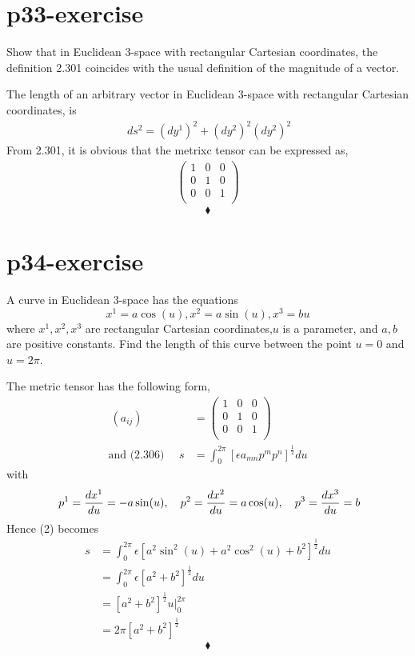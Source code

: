\section{p33-exercise}
\begin{tcolorbox}
Show that in Euclidean 3-space with rectangular Cartesian coordinates, the definition 2.301 coincides with the usual definition of the magnitude of a vector.
\end{tcolorbox}
The length of an arbitrary vector in Euclidean 3-space with rectangular Cartesian coordinates, is
\begin{align}
\ ds^2 = (dy^1)^2 + (dy^2)^2 (dy^2)^2
\end {align}
From 2.301, it is obvious that the metrixc tensor can be expressed as,
\begin{align}
\begin{pmatrix}1 & 0 &0 \\ 0 & 1 &0\\0 & 0 &1  \\ \end{pmatrix} 
\end{align}
$$\blacklozenge$$
\newpage


\section{p34-exercise}
\begin{tcolorbox}
A curve in Euclidean 3-space has the equations $$ x^1 =  a \cos(u), x^2 = a\sin(u), x^3 = bu$$ where $x^1, x^2,x^3$ are rectangular Cartesian coordinates,$u$ is a parameter, and $a, b$ are positive constants. Find the length of this curve between the point $u = 0$ and $u = 2\pi$.
\end{tcolorbox}
The metric tensor has the following form,
\begin{align}
\ (a_{ij}) &= \begin{pmatrix}1 & 0 &0 \\ 0 &1 &0\\0 & 0 &1  \\ \end{pmatrix} \\
\text {and  (2.306)  }\quad s &= \int^{2\pi}_0[\epsilon a_{mn}p^mp^n]^{\frac{1}{2}}du
\end{align}
with
\begin{align}
\ p^1 = \dv{x^1}{u} = -a\sin(u), \quad p^2 = \dv{x^2}{u} = a\cos(u), \quad p^3 = \dv{x^3}{u} = b
\end{align}
Hence (2) becomes
\begin{align}
s &= \int^{2\pi}_0\epsilon[a^2 \sin^2(u) + a^2\cos^2(u) + b^2]^{\frac{1}{2}}du\\
\ &= \int^{2\pi}_0\epsilon[a^2+  b^2]^{\frac{1}{2}}du\\
\ &= [a^2+  b^2]^{\frac{1}{2}} \left. u\right|^{2\pi}_0\\
\ &= 2\pi[a^2+  b^2]^{\frac{1}{2}} 
\end{align}
$$\blacklozenge$$
\newpage

